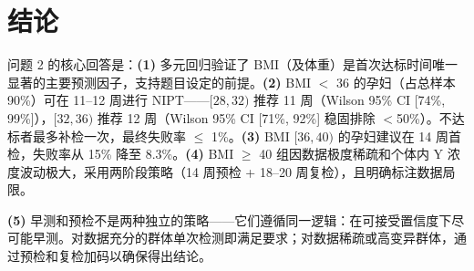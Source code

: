 \documentclass{internal-report}
\begin{document}
\section{结论}

问题 2 的核心回答是：\textbf{(1)} 多元回归验证了 BMI（及体重）是首次达标时间唯一显著的主要预测因子，支持题目设定的前提。\textbf{(2)} BMI $<$ 36 的孕妇（占总样本 90\%）可在 11--12 周进行 NIPT——$[28,32)$ 推荐 11 周（Wilson 95\% CI [74\%, 99\%]），$[32,36)$ 推荐 12 周（Wilson 95\% CI [71\%, 92\%] 稳固排除 $<$50\%）。不达标者最多补检一次，最终失败率 $\leq$ 1\%。\textbf{(3)} BMI $[36,40)$ 的孕妇建议在 14 周首检，失败率从 15\% 降至 8.3\%。\textbf{(4)} BMI $\geq$ 40 组因数据极度稀疏和个体内 Y 浓度波动极大，采用两阶段策略（14 周预检 + 18--20 周复检），且明确标注数据局限。

\textbf{(5)} 早测和预检不是两种独立的策略——它们遵循同一逻辑：在可接受置信度下尽可能早测。对数据充分的群体单次检测即满足要求；对数据稀疏或高变异群体，通过预检和复检加码以确保得出结论。
\end{document}
